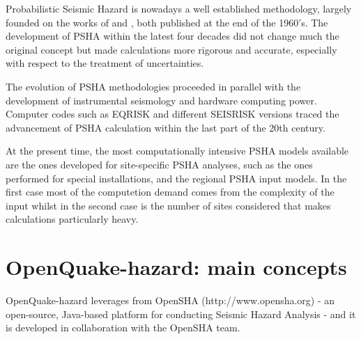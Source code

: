 Probabilistic Seismic Hazard is nowadays a well established methodology, largely founded on the works of \citeauthor{cornell1968} and \citeauthor{esteva1968}, both published at the end of the 1960's. 
%
The development of PSHA within the latest four decades did not change much the original concept but made calculations more rigorous and accurate, especially with respect to the treatment of uncertainties. 

The evolution of PSHA methodologies proceeded in parallel with the development of instrumental seismology and hardware computing power. Computer codes such as EQRISK \citep{mcguire1976} and different SEISRISK versions \citep{bender1982,bender1987} traced the advancement of PSHA calculation within
the last part of the 20th century.

At the present time, the most computationally intensive PSHA models available are the ones developed for site-specific PSHA analyses, such as the ones performed for special installations, and the regional PSHA input models. In the first case most of the computetion demand comes from the complexity of the input whilst in the second case is the number of sites considered that makes calculations particularly heavy.  
%
\section{OpenQuake-hazard: main concepts}
OpenQuake-hazard leverages from OpenSHA (http://www.opensha.org) - an open-source, Java-based platform for conducting Seismic Hazard Analysis - and it is developed in collaboration with the OpenSHA team. 

